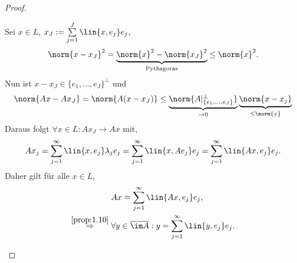 \begin{proof}
\begin{enumerate}[label=(\roman{*})]
Sei $x\in L$, $x_J :=\sum\limits_{j=1}^J \lin{x,e_j}e_j$,
\begin{align*}
\norm{x-x_J}^2 = \underbrace{\norm{x}^2 - \norm{x_J}^2}_{\text{Pythagoras}} \le
\norm{x}^2.
\end{align*}
Nun ist $x-x_J\in\{e_1,\ldots,e_J\}^\bot$ und
\begin{align*}
\norm{Ax - Ax_J} = \norm{A(x-x_J)}\le 
\underbrace{\norm{A|_{\{e_1,\ldots,e_J\}}^\bot}}_{\to
0}\underbrace{\norm{x-x_j}}_{\le\norm{x}}
\end{align*}
Daraus folgt $\forall x\in L : Ax_J\to Ax$ mit,
\begin{align*}
Ax_j = \sum\limits_{j=1}^\infty \lin{x,e_j}\lambda_je_j
= \sum\limits_{j=1}^\infty \lin{x,Ae_j}e_j
= \sum\limits_{j=1}^\infty \lin{Ax,e_j}e_j.
\end{align*} 
Daher gilt für alle $x\in L$,
\begin{align*}
&Ax = \sum\limits_{j=1}^\infty \lin{Ax,e_j}e_j,\\
\overset{\ref{prop:1.10}}{\Rightarrow}\;&
\forall y\in \overline{\im A} : y = \sum\limits_{j=1}^\infty
\lin{y,e_j}e_j.\qedhere
\end{align*}
\end{enumerate}
\end{proof}

